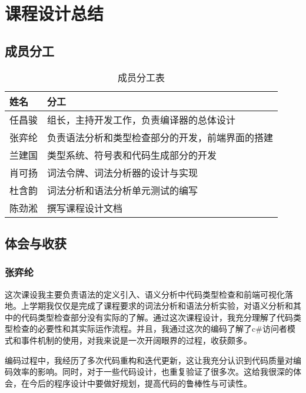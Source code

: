 \documentclass[../main.tex]{subfiles}
\begin{document}
\section{课程设计总结}


\subsection{成员分工}

\begin{table}[htbp]
    \centering
    \begin{tabular}{|l|l|}
        \hline
        \textbf{姓名} & \textbf{分工} \\
        \hline
        任昌骏 & 组长，主持开发工作，负责编译器的总体设计 \\
        \hline
        张弈纶 & 负责语法分析和类型检查部分的开发，前端界面的搭建 \\
        \hline
        兰建国 & 类型系统、符号表和代码生成部分的开发 \\
        \hline
        肖可扬 & 词法令牌、词法分析器的设计与实现 \\
        \hline
        杜含韵 & 词法分析和语法分析单元测试的编写 \\
        \hline
        陈劲淞 & 撰写课程设计文档 \\
        \hline
    \end{tabular}
    \caption{成员分工表}
    \label{tab:my_label}
\end{table}

\subsection{体会与收获}

\subsubsection{张弈纶}

这次课设我主要负责语法的定义引入、语义分析中代码类型检查和前端可视化落地。上学期我仅仅是完成了课程要求的词法分析和语法分析实验，对语义分析和其中的代码类型检查部分没有实际的了解。通过这次课程设计，我充分理解了代码类型检查的必要性和其实际运作流程。并且，我通过这次的编码了解了c\#访问者模式和事件机制的使用，对我来说是一次开阔眼界的过程，收获颇多。

编码过程中，我经历了多次代码重构和迭代更新，这让我充分认识到代码质量对编码效率的影响。同时，对于一些代码设计，也重复验证了很多次。这给我很深的体会，在今后的程序设计中要做好规划，提高代码的鲁棒性与可读性。
\end{document}

